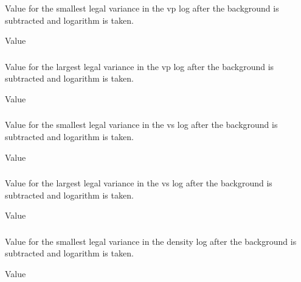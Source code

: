 \subsubsection{}
 \slist
   \item \Description Value for the smallest legal variance in the vp log after the background is subtracted and logarithm is taken.
   \item \Argument Value
   \item {}
 \elist

\subsubsection{}
 \slist
   \item \Description Value for the largest legal variance in the vp log after the background is subtracted and logarithm is taken.
   \item \Argument Value
   \item {}
 \elist

\subsubsection{}
 \slist
   \item \Description Value for the smallest legal variance in the vs log after the background is subtracted and logarithm is taken.
   \item \Argument Value
   \item {}
 \elist

\subsubsection{}
 \slist
   \item \Description Value for the largest legal variance in the vs log after the background is subtracted and logarithm is taken.
   \item \Argument Value
   \item {}
 \elist

\subsubsection{}
 \slist
   \item \Description Value for the smallest legal variance in the density log after the background is subtracted and logarithm is taken.
   \item \Argument Value
   \item {}
 \elist

